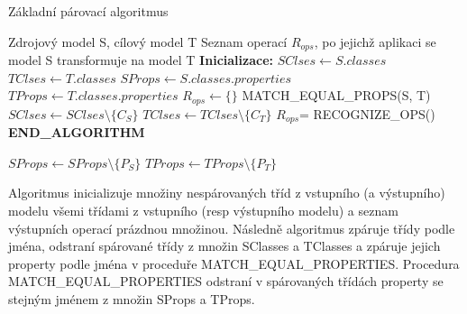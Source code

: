 \documentclass[11pt,twoside,a4paper]{book}
\begin{document}
 \begin{algorithm}
 \caption{Základní párovací algoritmus}\label{algo:matching}

\begin{algorithmic}[1]
   \Require Zdrojový model S, cílový model T
   \Ensure Seznam operací $R_{ops}$, po jejichž aplikaci se model S transformuje
       na model T
   \Statex
   \State \textbf{Inicializace:}
   \State $SClses \gets S.classes$  
   \State $TClses \gets T.classes$ 
   \State $SProps \gets S.classes.properties$ 
   \State $TProps \gets T.classes.properties$ 
   \State $R_{ops} \gets \{\}$
   \Statex	   
    \label{algo:matching:forEqualCls}
   	        \State MATCH\_EQUAL\_PROPS(S, T) 
   	        \State $SClses \gets SClses \setminus \{ C_S\}$
   	        \State $TClses \gets TClses \setminus \{ C_T\}$   	        
   	     \EndIf
      \EndFor
   \EndFor
   \State $R_{ops}$= RECOGNIZE\_OPS()
   \State \textbf{END\_ALGORITHM}
   
   \Statex	
   	           \State $SProps \gets SProps \setminus \{ P_S\}$
   	           \State $TProps \gets TProps \setminus \{ P_T\}$
   	        \EndIf
   	      \EndFor
   	   \EndFor
   \EndProcedure  
\end{algorithmic}
\end{algorithm}

\FloatBarrier

Algoritmus inicializuje množiny nespárovaných tříd z vstupního (a výstupního)
modelu všemi třídami z vstupního (resp výstupního modelu) a seznam výstupních
operací prázdnou množinou. Následně algoritmus zpáruje třídy podle jména,
odstraní spárované třídy z množin SClasses a TClasses a zpáruje jejich property
podle jména v proceduře MATCH\_EQUAL\_PROPERTIES. Procedura
MATCH\_EQUAL\_PROPERTIES odstraní v spárovaných třídách property se stejným
jménem z množin SProps a TProps.
\end{document}
